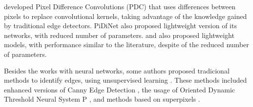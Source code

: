 {



\cite{Su:2021} developed Pixel Difference Convolutions (PDC) that uses differences between pixels to replace convolutional kernels, taking advantage of the knowledge gained by traditional edge detectors.
PiDiNet also proposed lightweight version of its networks, with reduced number of parameters.
\cite{Wibisono:2020} and \cite{Wibisono:2021} also proposed lightweight models, with performance similar to the literature, despite of the reduced number of parameters.

Besides the works with neural networks, some authors proposed tradicional methods to identify edges, using unsupervised learning \cite{Wan:2020, Wang:2020, Lin:2021, Dhillon:2022, Yan:2022}.
These methods included enhanced versions of Canny Edge Detection \cite{Dhillon:2022}, the usage of Oriented Dynamic Threshold Neural System P \cite{Yan:2022}, and methods based on superpixels \cite{Wan:2020, Lin:2021}.

\begin{comment}
{\color{blue}
The analysis of related works provides important information regarding some trends in neural networks for edge detection.
One trend is that side-outputs have been widely used in edge detection works in recent years.
In addition, the results indicate that at least the 5 best ODS values in the BSDS500 were achieved by methods that combine intermediary features.


Another important information is related to the number of papers that developed their own loss functions.
For training their network architecture, 11 of 18 works developed its own custom loss.
This is observed due to the characteristics of the problem, where there is an imbalance between edge and background pixels.
According to \cite{ReExtraction:Wen201884}, approximately 83\% of the pixels in the original BSDS500 testing images are non-edge pixels.


\end{comment}}
